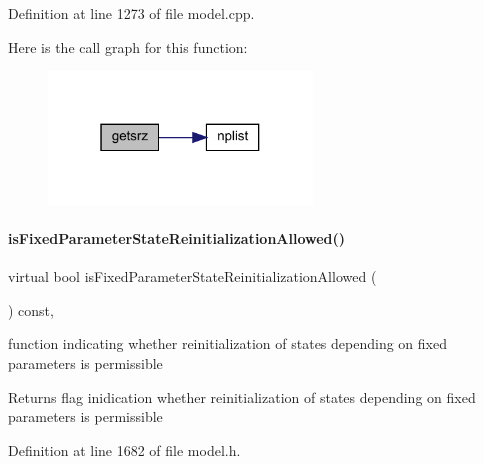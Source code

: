 Definition at line 1273 of file model.\+cpp.

Here is the call graph for this function\+:
\nopagebreak
\begin{figure}[H]
\begin{center}
\leavevmode
\includegraphics[width=199pt]{classamici_1_1_model_a49336e5923942fc5b4b26d6facf90b1d_cgraph}
\end{center}
\end{figure}
\mbox{\label{classamici_1_1_model_aee70a0075a3b36896dee7ba80415df3c}} 
\paragraph{\texorpdfstring{is\+Fixed\+Parameter\+State\+Reinitialization\+Allowed()}{isFixedParameterStateReinitializationAllowed()}}
{\footnotesize\ttfamily virtual bool is\+Fixed\+Parameter\+State\+Reinitialization\+Allowed (\begin{DoxyParamCaption}{ }\end{DoxyParamCaption}) const\hspace{0.3cm}{\ttfamily [protected]}, {\ttfamily [virtual]}}

function indicating whether reinitialization of states depending on fixed parameters is permissible \begin{DoxyReturn}{Returns}
flag inidication whether reinitialization of states depending on fixed parameters is permissible 
\end{DoxyReturn}


Definition at line 1682 of file model.\+h.

